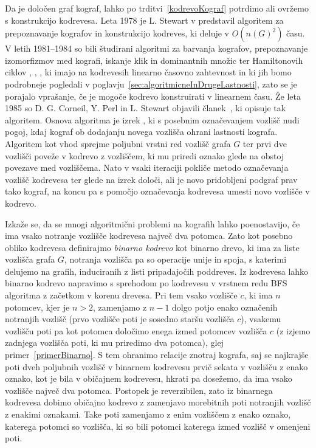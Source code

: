 \documentclass[12pt,a4paper,twoside]{article}
\theoremstyle{definition} %
\theoremstyle{plain} %
\numberwithin{equation}{section}  %
\begin{document}
Da je določen graf kograf, lahko po trditvi~\ref{kodrevoKograf} potrdimo ali ovržemo s konstrukcijo kodrevesa. Leta 1978 je L. Stewart v \cite{stewart1978cographs} predstavil algoritem za prepoznavanje kografov in konstrukcijo kodreves, ki deluje v $O(n(G)^2)$ času. V letih 1981--1984 so bili študirani algoritmi za barvanja kografov, prepoznavanje izomorfizmov med kografi, iskanje klik in dominantnih množic ter Hamiltonovih ciklov \cite{corneil1981complement}, \cite{corneil1984clustering}, \cite{corneil1984cographs}, ki imajo na kodrevesih linearno časovno zahtevnost in ki jih bomo podrobneje pogledali v poglavju~\ref{sec:algoritmicneInDrugeLastnosti}, zato se je porajalo vprašanje, če je mogoče kodrevo konstruirati v linearnem času. Že leta 1985 so D. G. Corneil, Y. Perl in L. Stewart objavili članek~\cite{corneil1985linear}, ki opisuje tak algoritem. Osnova algoritma je izrek \cite[Theorem 1]{corneil1985linear}, ki s posebnim označevanjem vozlišč nudi pogoj, kdaj kograf ob dodajanju novega vozlišča ohrani lastnosti kografa. Algoritem \cite[Algorithm Cograph-recognition]{corneil1985linear} kot vhod sprejme poljubni vrstni red vozlišč grafa $G$ ter prvi dve vozlišči poveže v kodrevo z vozliščem, ki mu priredi oznako glede na obstoj povezave med vozliščema. Nato v vsaki iteraciji pokliče metodo označevanja vozlišč kodrevesa ter glede na izrek \cite[Theorem 1]{corneil1985linear} določi, ali je novo pridobljeni podgraf prav tako kograf, na koncu pa s pomočjo označevanja kodrevesa umesti novo vozlišče v kodrevo.

\medskip
Izkaže se, da se mnogi algoritmični problemi na kografih lahko poenostavijo, če ima vsako notranje vozlišče kodrevesa največ dva potomca. Zato kot posebno obliko kodrevesa definirajmo \emph{binarno kodrevo} kot binarno drevo, ki ima za liste vozlišča grafa $G$, notranja vozlišča pa so operacije unije in spoja, s katerimi delujemo na grafih, induciranih z listi pripadajočih poddreves. Iz kodrevesa lahko binarno kodrevo napravimo s sprehodom po kodrevesu v vrstnem redu BFS algoritma z začetkom v korenu drevesa. Pri tem vsako vozlišče $c$, ki ima $n$ potomcev, kjer je $n > 2$, zamenjamo z $n-1$ dolgo potjo enako označenih notranjih vozlišč (prvo vozlišče poti je sosedno staršu vozlišča $c$), vsakemu vozlišču poti pa kot potomca določimo enega izmed potomcev vozlišča $c$ (z izjemo zadnjega vozlišča poti, ki mu priredimo dva potomca), glej primer~\ref{primerBinarno}. S tem ohranimo relacije znotraj kografa, saj se najkrajše poti dveh poljubnih vozlišč v binarnem kodrevesu prvič sekata v vozlišču z enako oznako, kot je bila v običajnem kodrevesu, hkrati pa dosežemo, da ima vsako vozlišče največ dva potomca. Postopek je reverzibilen, zato iz binarnega kodrevesa dobimo običajno kodrevo z zamenjavo morebitnih poti notranjih vozlišč z enakimi oznakami. Take poti zamenjamo z enim vozliščem z enako oznako, katerega potomci so vozlišča, ki so bili potomci katerega izmed vozlišč v omenjeni poti.
\end{document}

